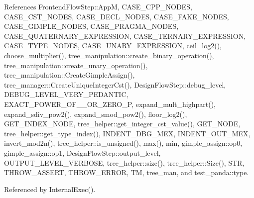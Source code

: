 References Frontend\+Flow\+Step\+::\+AppM, C\+A\+S\+E\+\_\+\+C\+P\+P\+\_\+\+N\+O\+D\+ES, C\+A\+S\+E\+\_\+\+C\+S\+T\+\_\+\+N\+O\+D\+ES, C\+A\+S\+E\+\_\+\+D\+E\+C\+L\+\_\+\+N\+O\+D\+ES, C\+A\+S\+E\+\_\+\+F\+A\+K\+E\+\_\+\+N\+O\+D\+ES, C\+A\+S\+E\+\_\+\+G\+I\+M\+P\+L\+E\+\_\+\+N\+O\+D\+ES, C\+A\+S\+E\+\_\+\+P\+R\+A\+G\+M\+A\+\_\+\+N\+O\+D\+ES, C\+A\+S\+E\+\_\+\+Q\+U\+A\+T\+E\+R\+N\+A\+R\+Y\+\_\+\+E\+X\+P\+R\+E\+S\+S\+I\+ON, C\+A\+S\+E\+\_\+\+T\+E\+R\+N\+A\+R\+Y\+\_\+\+E\+X\+P\+R\+E\+S\+S\+I\+ON, C\+A\+S\+E\+\_\+\+T\+Y\+P\+E\+\_\+\+N\+O\+D\+ES, C\+A\+S\+E\+\_\+\+U\+N\+A\+R\+Y\+\_\+\+E\+X\+P\+R\+E\+S\+S\+I\+ON, ceil\+\_\+log2(), choose\+\_\+multiplier(), tree\+\_\+manipulation\+::create\+\_\+binary\+\_\+operation(), tree\+\_\+manipulation\+::create\+\_\+unary\+\_\+operation(), tree\+\_\+manipulation\+::\+Create\+Gimple\+Assign(), tree\+\_\+manager\+::\+Create\+Unique\+Integer\+Cst(), Design\+Flow\+Step\+::debug\+\_\+level, D\+E\+B\+U\+G\+\_\+\+L\+E\+V\+E\+L\+\_\+\+V\+E\+R\+Y\+\_\+\+P\+E\+D\+A\+N\+T\+IC, E\+X\+A\+C\+T\+\_\+\+P\+O\+W\+E\+R\+\_\+\+O\+F\+\_\+\_\+\+O\+R\+\_\+\+Z\+E\+R\+O\+\_\+P, expand\+\_\+mult\+\_\+highpart(), expand\+\_\+sdiv\+\_\+pow2(), expand\+\_\+smod\+\_\+pow2(), floor\+\_\+log2(), G\+E\+T\+\_\+\+I\+N\+D\+E\+X\+\_\+\+N\+O\+DE, tree\+\_\+helper\+::get\+\_\+integer\+\_\+cst\+\_\+value(), G\+E\+T\+\_\+\+N\+O\+DE, tree\+\_\+helper\+::get\+\_\+type\+\_\+index(), I\+N\+D\+E\+N\+T\+\_\+\+D\+B\+G\+\_\+\+M\+EX, I\+N\+D\+E\+N\+T\+\_\+\+O\+U\+T\+\_\+\+M\+EX, invert\+\_\+mod2n(), tree\+\_\+helper\+::is\+\_\+unsigned(), max(), min, gimple\+\_\+assign\+::op0, gimple\+\_\+assign\+::op1, Design\+Flow\+Step\+::output\+\_\+level, O\+U\+T\+P\+U\+T\+\_\+\+L\+E\+V\+E\+L\+\_\+\+V\+E\+R\+B\+O\+SE, tree\+\_\+helper\+::size(), tree\+\_\+helper\+::\+Size(), S\+TR, T\+H\+R\+O\+W\+\_\+\+A\+S\+S\+E\+RT, T\+H\+R\+O\+W\+\_\+\+E\+R\+R\+OR, TM, tree\+\_\+man, and test\+\_\+panda\+::type.



Referenced by Internal\+Exec().

